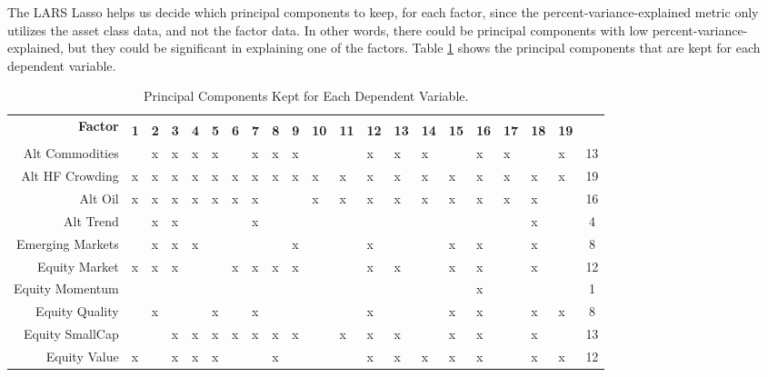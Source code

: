 \documentclass{ledger}
\begin{document}
The LARS Lasso helps us decide which principal components to keep, for each factor, since the percent-variance-explained metric only utilizes the asset class data, and not the factor data. In other words, there could be principal components with low percent-variance-explained, but they could be significant in explaining one of the factors. Table \ref{tab:pcs_kept} shows the principal components that are kept for each dependent variable. \\

\begin{table}[!ht]
\centering
\caption{Principal Components Kept for Each Dependent Variable. \label{tab:pcs_kept}}
\setlength{\tabcolsep}{3pt} %
\footnotesize %
\begin{tabular}{r*{19}{>{\centering\arraybackslash}p{0.4cm}}c} %
	\toprule
		\multirow{2}{*}{\textbf{Factor}} & \multicolumn{19}{c}{\textbf{Principal Components}} & \multirow{2}{*}{\textbf{Total}} \\
	\cmidrule(lr){2-20}
			& \textbf{1} & \textbf{2} & \textbf{3} & \textbf{4} & \textbf{5} & \textbf{6} & \textbf{7} & \textbf{8} & \textbf{9} & \textbf{10} & \textbf{11} & \textbf{12} & \textbf{13} & \textbf{14} & \textbf{15} & \textbf{16} & \textbf{17} & \textbf{18} & \textbf{19} & \\
	\midrule
		Alt Commodities   & & x & x & x & x & & x & x & x & & & x & x & x & & x & x & & x & 13 \\
		Alt HF Crowding   & x & x & x & x & x & x & x & x & x & x & x & x & x & x & x & x & x & x & x & 19 \\
		Alt Oil           & x & x & x & x & x & x & x & & & x & x & x & x & x & x & x & x & x & & 16 \\
		Alt Trend         & & x & x & & & & x & & & & & & & & & & & x & & 4 \\
		Emerging Markets  & & x & x & x & & & & & x & & & x & & & x & x & & x & & 8 \\
		Equity Market     & x & x & x & & & x & x & x & x & & & x & x & & x & x & & x & & 12 \\
		Equity Momentum   & & & & & & & & & & & & & & & & x & & & & 1 \\
		Equity Quality    & & x & & & x & & x & & & & & x & & & x & x & & x & x & 8 \\
		Equity SmallCap   & & & x & x & x & x & x & x & x & & x & x & x & & x & x & & x & & 13 \\
		Equity Value      & x & & x & x & x & & & x & & & & x & x & x & x & x & & x & x & 12 \\

\end{tabular}
\end{table}
\end{document}
